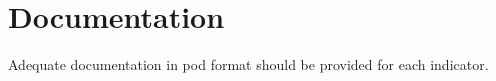 \documentclass[11pt,twoside]{article}
\begin{document}
\section{Documentation}
Adequate documentation in pod format should be provided for each
indicator.

\end{document}
